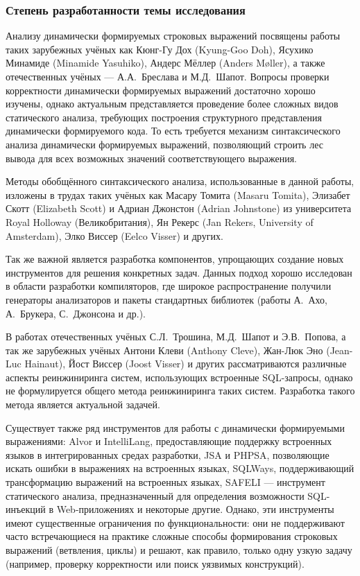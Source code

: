\subsubsection*{\large{Степень разработанности темы исследования}}

Анализу динамически формируемых строковых выражений посвящены работы таких зарубежных учёных как Кюнг-Гу Дох (Kyung-Goo Doh), Ясухико Минамиде (Minamide Yasuhiko), Андерс Мёллер (Anders M{\o}ller), а также отечественных учёных --- А.А.~Бреслава и М.Д.~Шапот. Вопросы проверки корректности динамически формируемых выражений достаточно хорошо изучены, однако актуальным представляется проведение более сложных видов статического анализа, требующих построения структурного представления динамически формируемого кода. То есть требуется механизм синтаксического анализа динамически формируемых выражений, позволяющий строить лес вывода для всех возможных значений соответствующего выражения. 

Методы обобщённого синтаксического анализа, использованные в данной работы, изложены в трудах таких учёных как Масару Томита (Masaru Tomita), Элизабет Скотт (Elizabeth Scott) и Адриан Джонстон (Adrian Johnstone) из университета Royal Holloway (Великобритания), Ян Рекерс (Jan Rekers, University of Amsterdam), Элко Виссер (Eelco Visser) и других.

Так же важной является разработка компонентов, упрощающих создание новых инструментов для решения конкретных задач. Данных подход хорошо исследован в области разработки компиляторов, где широкое распространение получили генераторы анализаторов и пакеты стандартных библиотек (работы А.~Ахо, А.~Брукера, С.~Джонсона и др.). 

В работах отечественных учёных С.Л.~Трошина, М.Д.~Шапот и Э.В.~Попова, а так же зарубежных учёных Антони Клеви (Anthony Cleve), Жан-Люк Эно (Jean-Luc Hainaut), Йост Виссер (Joost Visser) и других рассматриваются различные аспекты реинжиниринга систем, использующих встроенные SQL-запросы, однако не формулируется общего метода реинжиниринга таких систем. Разработка такого метода является актуальной задачей.

Существует также ряд инструментов для работы с динамически формируемыми выражениями: Alvor и IntelliLang, предоставляющие поддержку встроенных языков в интегрированных средах разработки, JSA и PHPSA, позволяющие искать ошибки в выражениях на встроенных языках, SQLWays, поддерживающий трансформацию выражений на встроенных языках, SAFELI --- инструмент статического анализа, предназначенный для определения возможности SQL-инъекций в Web-приложениях и некоторые другие. Однако, эти инструменты имеют существенные ограничения по функциональности: они не поддерживают часто встречающиеся на практике сложные способы формирования строковых выражений (ветвления, циклы) и решают, как правило, только одну узкую задачу (например, проверку корректности или поиск уязвимых конструкций).

